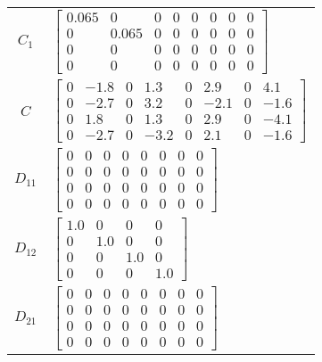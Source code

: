 \begin{tabular}{cl}
 $C_{1}$  & $\left[\begin{matrix}0.065 & 0 & 0 & 0 & 0 & 0 & 0 & 0\\0 & 0.065 & 0 & 0 & 0 & 0 & 0 & 0\\0 & 0 & 0 & 0 & 0 & 0 & 0 & 0\\0 & 0 & 0 & 0 & 0 & 0 & 0 & 0\end{matrix}\right]$                                                                                                                                               \\
   $C$    & $\left[\begin{matrix}0 & -1.8 & 0 & 1.3 & 0 & 2.9 & 0 & 4.1\\0 & -2.7 & 0 & 3.2 & 0 & -2.1 & 0 & -1.6\\0 & 1.8 & 0 & 1.3 & 0 & 2.9 & 0 & -4.1\\0 & -2.7 & 0 & -3.2 & 0 & 2.1 & 0 & -1.6\end{matrix}\right]$                                                                                                               \\
 $D_{11}$ & $\left[\begin{matrix}0 & 0 & 0 & 0 & 0 & 0 & 0 & 0\\0 & 0 & 0 & 0 & 0 & 0 & 0 & 0\\0 & 0 & 0 & 0 & 0 & 0 & 0 & 0\\0 & 0 & 0 & 0 & 0 & 0 & 0 & 0\end{matrix}\right]$                                                                                                                                                       \\
 $D_{12}$ & $\left[\begin{matrix}1.0 & 0 & 0 & 0\\0 & 1.0 & 0 & 0\\0 & 0 & 1.0 & 0\\0 & 0 & 0 & 1.0\end{matrix}\right]$                                                                                                                                                                                                               \\
 $D_{21}$ & $\left[\begin{matrix}0 & 0 & 0 & 0 & 0 & 0 & 0 & 0\\0 & 0 & 0 & 0 & 0 & 0 & 0 & 0\\0 & 0 & 0 & 0 & 0 & 0 & 0 & 0\\0 & 0 & 0 & 0 & 0 & 0 & 0 & 0\end{matrix}\right]$                                                                                                                                                       \\
\hline
\end{tabular}
